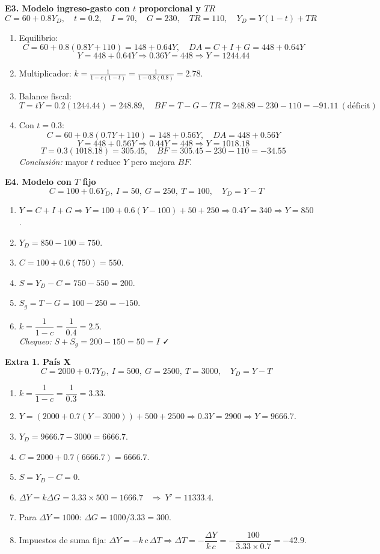 \documentclass[11pt,addpoints]{article}
\begin{document}
\textbf{E3. Modelo ingreso-gasto con $t$ proporcional y $TR$}
\[
C=60+0.8Y_D,\quad t=0.2,\quad I=70,\quad G=230,\quad TR=110,\quad Y_D=Y(1-t)+TR
\]
\begin{enumerate}[label=\alph*)]
\item Equilibrio:
\[
C=60+0.8(0.8Y+110)=148+0.64Y,\quad DA=C+I+G=448+0.64Y
\]
\[
Y=448+0.64Y\Rightarrow 0.36Y=448\Rightarrow \boxed{Y=1244.44}
\]
\item Multiplicador: \(\displaystyle k=\frac{1}{1-c(1-t)}=\frac{1}{1-0.8(0.8)}=\boxed{2.78}\).
\item Balance fiscal:
\[
T=tY=0.2(1244.44)=248.89,\quad BF=T-G-TR=248.89-230-110=\boxed{-91.11}\ (\text{déficit})
\]

\newpage
\vspace*{0.1cm}
\item Con $t=0.3$:
\[
C=60+0.8(0.7Y+110)=148+0.56Y,\quad DA=448+0.56Y
\]
\[
Y=448+0.56Y\Rightarrow 0.44Y=448\Rightarrow \boxed{Y=1018.18}
\]
\[
T=0.3(1018.18)=305.45,\quad BF=305.45-230-110=\boxed{-34.55}
\]
\textit{Conclusión:} mayor $t$ reduce $Y$ pero mejora $BF$.
\end{enumerate}

\bigskip
\textbf{E4. Modelo con $T$ fijo}
\[
C=100+0.6Y_D,\ I=50,\ G=250,\ T=100,\quad Y_D=Y-T
\]
\begin{enumerate}[label=\alph*)]
\item $Y=C+I+G\Rightarrow Y=100+0.6(Y-100)+50+250 \Rightarrow 0.4Y=340 \Rightarrow \boxed{Y=850}$.
\item $Y_D=850-100=\boxed{750}$.
\item $C=100+0.6(750)=\boxed{550}$.
\item $S=Y_D-C=750-550=\boxed{200}$.
\item $S_g=T-G=100-250=\boxed{-150}$.
\item $k=\dfrac{1}{1-c}=\dfrac{1}{0.4}=\boxed{2.5}$. \\
\textit{Chequeo:} $S+S_g=200-150=50=I$ ✓
\end{enumerate}

\bigskip
\textbf{Extra 1. País X}
\[
C=2000+0.7Y_D,\ I=500,\ G=2500,\ T=3000,\quad Y_D=Y-T
\]
\begin{enumerate}[label=\alph*)]
\item $k=\dfrac{1}{1-c}=\dfrac{1}{0.3}=\boxed{3.33}$.
\item $Y=(2000+0.7(Y-3000))+500+2500 \Rightarrow 0.3Y=2900 \Rightarrow \boxed{Y=9666.7}$.
\item $Y_D=9666.7-3000=\boxed{6666.7}$.

\item $C=2000+0.7(6666.7)=\boxed{6666.7}$.
\item $S=Y_D-C=0$.
\item $\Delta Y=k\Delta G=3.33\times 500=\boxed{1666.7}$ \ $\Rightarrow\ Y'=11333.4$.
\item Para $\Delta Y=1000$: $\Delta G=1000/3.33=\boxed{300}$.
\item Impuestos de suma fija: $\Delta Y=-k\,c\,\Delta T \Rightarrow \Delta T=-\dfrac{\Delta Y}{k\,c}=-\dfrac{100}{3.33\times 0.7}=\boxed{-42.9}$.
\end{enumerate}
\end{document}
